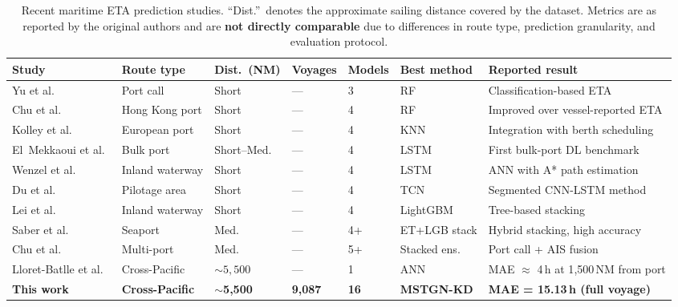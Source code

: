 \documentclass[conference]{IEEEtran}
\begin{document}
\begin{table}[t]
    \centering
    \caption{Recent maritime ETA prediction studies. ``Dist.''~denotes the approximate sailing distance covered by the dataset. Metrics are as reported by the original authors and are \textbf{not directly comparable} due to differences in route type, prediction granularity, and evaluation protocol.}
    \label{tab:lit_comparison}
    \footnotesize
    \setlength{\tabcolsep}{3pt}
    \renewcommand{\arraystretch}{1.15}
    \begin{tabular}{P{2.5cm} P{1.5cm} P{1.7cm} P{1.5cm} P{1.2cm} P{2.0cm} P{3.8cm}}
        \toprule
        \textbf{Study} & \textbf{Route type} & \textbf{Dist.\ (NM)} & \textbf{Voyages} & \textbf{Models} & \textbf{Best method} & \textbf{Reported result} \\
        \midrule
        Yu et al.~\cite{yuShipArrivalPrediction2018} & Port call & Short & --- & 3 & RF & Classification-based ETA \\
        Chu et al.~\cite{chuEvaluationPredictionPunctuality2023} & Hong Kong port & Short & --- & 4 & RF & Improved over vessel-reported ETA \\
        Kolley et al.~\cite{kolleyRobustBerthScheduling2022} & European port & Short & --- & 4 & KNN & Integration with berth scheduling \\
        El~Mekkaoui et al.~\cite{elmekkaouiDeepLearningModels2022} & Bulk port & Short--Med. & --- & 4 & LSTM & First bulk-port DL benchmark \\
        Wenzel et al.~\cite{wenzelNeuralNetworkApproach2023} & Inland waterway & Short & --- & 4 & LSTM & ANN with A* path estimation \\
        Du et al.~\cite{duSegmentedETAPrediction2025} & Pilotage area & Short & --- & 4 & TCN & Segmented CNN-LSTM method \\
        Lei et al.~\cite{leiPredictingVesselArrival2024} & Inland waterway & Short & --- & 4 & LightGBM & Tree-based stacking \\
        Saber et al.~\cite{saberHighaccuracyPredictionVessels2025} & Seaport & Med. & --- & 4+ & ET+LGB stack & Hybrid stacking, high accuracy \\
        Chu et al.~\cite{chuVesselArrivalTime2025} & Multi-port & Med. & --- & 5+ & Stacked ens. & Port call + AIS fusion \\
        Lloret-Batlle et al.~\cite{lloretbatlle2025} & Cross-Pacific & ${\sim}5{,}500$ & --- & 1 & ANN & MAE $\approx$ 4\,h at 1{,}500\,NM from port \\
        \midrule
        \textbf{This work} & \textbf{Cross-Pacific} & $\boldsymbol{\sim}$\textbf{5,500} & \textbf{9,087} & \textbf{16} & \textbf{MSTGN-KD} & \textbf{MAE = 15.13\,h (full voyage)} \\
        \bottomrule
    \end{tabular}
\end{table}
\end{document}
